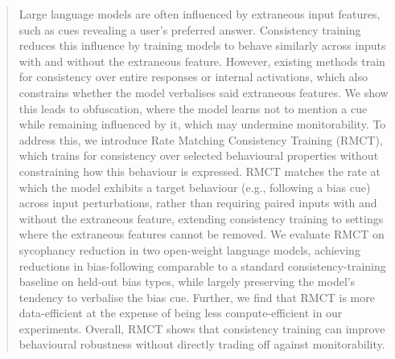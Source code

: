 \documentclass{article}
\begin{document}

\printAffiliationsAndNotice{}

\begin{abstract}

Large language models are often influenced by extraneous input features, such as cues revealing a user’s preferred answer. Consistency training reduces this influence by training models to behave similarly across inputs with and without the extraneous feature. However, existing methods train for consistency over entire responses or internal activations, which also constrains whether the model verbalises said extraneous features. We show this leads to obfuscation, where the model learns not to mention a cue while remaining influenced by it, which may undermine monitorability. To address this, we introduce Rate Matching Consistency Training (RMCT), which trains for consistency over selected behavioural properties without constraining how this behaviour is expressed. RMCT matches the rate at which the model exhibits a target behaviour (e.g., following a bias cue) across input perturbations, rather than requiring paired inputs with and without the extraneous feature, extending consistency training to settings where the extraneous features cannot be removed. We evaluate RMCT on sycophancy reduction in two open-weight language models, achieving reductions in bias-following comparable to a standard consistency-training baseline on held-out bias types, while largely preserving the model’s tendency to verbalise the bias cue. Further, we find that RMCT is more data-efficient at the expense of being less compute-efficient in our experiments. Overall, RMCT shows that consistency training can improve behavioural robustness without directly trading off against monitorability.
\end{abstract}
\end{document}

